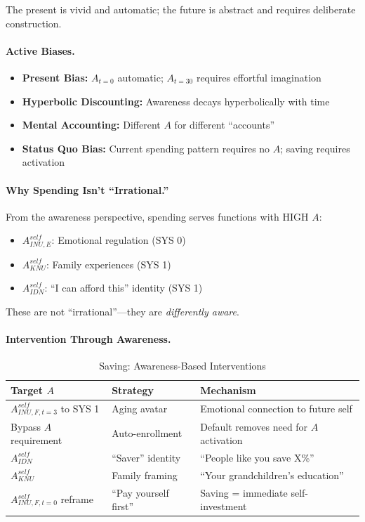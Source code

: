 The present is vivid and automatic; the future is abstract and requires 
deliberate construction.

\paragraph{Active Biases.}
\begin{itemize}
\item \textbf{Present Bias:} $A_{t=0}$ automatic; $A_{t=30}$ requires effortful imagination
\item \textbf{Hyperbolic Discounting:} Awareness decays hyperbolically with time
\item \textbf{Mental Accounting:} Different $A$ for different ``accounts''
\item \textbf{Status Quo Bias:} Current spending pattern requires no $A$; 
saving requires activation
\end{itemize}

\paragraph{Why Spending Isn't ``Irrational.''}
From the awareness perspective, spending serves functions with HIGH $A$:
\begin{itemize}
\item $A^{self}_{INU,E}$: Emotional regulation (SYS 0)
\item $A^{self}_{KNU}$: Family experiences (SYS 1)
\item $A^{self}_{IDN}$: ``I can afford this'' identity (SYS 1)
\end{itemize}

These are not ``irrational''---they are \emph{differently aware}.

\paragraph{Intervention Through Awareness.}

\begin{table}[htbp]
\centering
\caption{Saving: Awareness-Based Interventions}
\label{tab:saving-intervention}
\renewcommand{\arraystretch}{1.3}
\begin{tabular}{@{}lll@{}}
\toprule
\textbf{Target $A$} & \textbf{Strategy} & \textbf{Mechanism} \\
\midrule
$A^{self}_{INU,F,t=3}$ to SYS 1 & Aging avatar & Emotional connection to future self \\
Bypass $A$ requirement & Auto-enrollment & Default removes need for $A$ activation \\
$A^{self}_{IDN}$ & ``Saver'' identity & ``People like you save X\%'' \\
$A^{self}_{KNU}$ & Family framing & ``Your grandchildren's education'' \\
$A^{self}_{INU,F,t=0}$ reframe & ``Pay yourself first'' & Saving = immediate self-investment \\
\bottomrule
\end{tabular}
\end{table}

